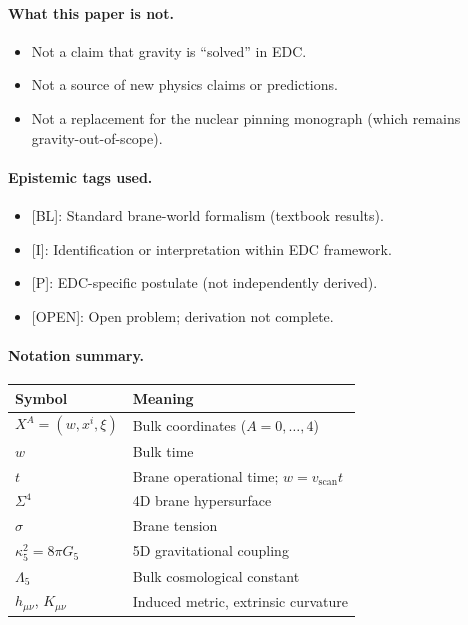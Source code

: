 \documentclass[11pt,a4paper]{article}
\newcommand{\tagBL}{\textcolor{blue!70!black}{[BL]}}
\newcommand{\tagI}{\textcolor{green!50!black}{[I]}}
\newcommand{\tagP}{\textcolor{orange!80!black}{[P]}}
\newcommand{\tagOPEN}{\textcolor{red!70!black}{[OPEN]}}
\begin{document}
\paragraph{What this paper is not.}
\begin{itemize}[nosep]
    \item Not a claim that gravity is ``solved'' in EDC.
    \item Not a source of new physics claims or predictions.
    \item Not a replacement for the nuclear pinning monograph (which remains gravity-out-of-scope).
\end{itemize}

\paragraph{Epistemic tags used.}
\begin{itemize}[nosep]
    \item \tagBL{}: Standard brane-world formalism (textbook results).
    \item \tagI{}: Identification or interpretation within EDC framework.
    \item \tagP{}: EDC-specific postulate (not independently derived).
    \item \tagOPEN{}: Open problem; derivation not complete.
\end{itemize}

\paragraph{Notation summary.}
\begin{center}
\small
\begin{tabular}{ll}
\toprule
\textbf{Symbol} & \textbf{Meaning} \\
\midrule
$X^A = (w, x^i, \xi)$ & Bulk coordinates ($A = 0,\ldots,4$) \\
$w$ & Bulk time \\
$t$ & Brane operational time; $w = v_{\mathrm{scan}} t$ \\
$\Sigma^4$ & 4D brane hypersurface \\
$\sigma$ & Brane tension \\
$\kappa_5^2 = 8\pi G_5$ & 5D gravitational coupling \\
$\Lambda_5$ & Bulk cosmological constant \\
$h_{\mu\nu}$, $K_{\mu\nu}$ & Induced metric, extrinsic curvature \\
\bottomrule
\end{tabular}
\end{center}
\end{document}
